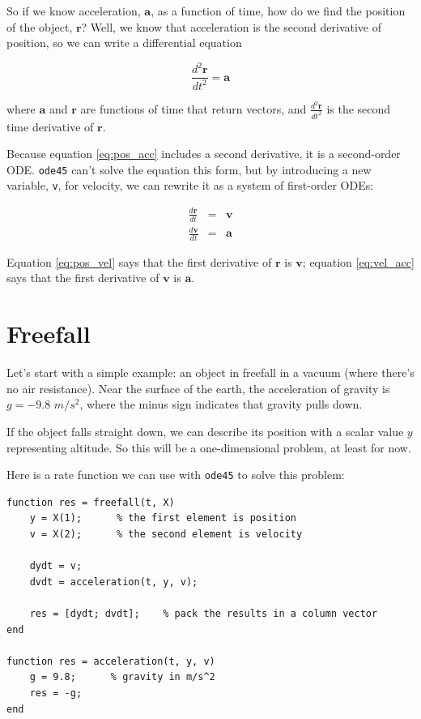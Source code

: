 \documentclass[
]{book}
\renewcommand{\vec}[1]{\bm{\mathbf{#1}}}
\begin{document}
So if we know acceleration, $\vec{a}$, as a function of time, how do we
find the position of the object, $\vec{r}$?  Well, we know that acceleration
is the second derivative of position, so we can write a differential
equation

\begin{equation}\label{eq:pos_acc}
    \frac{d^2\vec{r}}{dt^2} = \vec{a}
\end{equation}

where $\vec{a}$ and $\vec{r}$ are functions of time that return vectors,
and $\frac{d^2\vec{r}}{dt^2}$ is the second time derivative of $\vec{r}$.

Because equation \eqref{eq:pos_acc} includes a second derivative, it is
a second-order ODE.  {\tt ode45} can't solve the equation this form, but
by introducing a new variable, {\tt v}, for velocity, we can rewrite it
as a system of first-order ODEs:

\begin{eqnarray}
    \label{eq:pos_vel}
    \frac{d\vec{r}}{dt} &=& \vec{v} \\
    \label{eq:vel_acc}
    \frac{d\vec{v}}{dt} &=& \vec{a}
\end{eqnarray}

Equation \eqref{eq:pos_vel} says that the first derivative of $\vec{r}$ is $\vec{v}$;
equation \eqref{eq:vel_acc} says that the first derivative of $\vec{v}$ is $\vec{a}$.


\section{Freefall}
\label{sect:freefall}

Let's start with a simple example: an object in freefall in a vacuum
(where there's no air resistance).  Near the surface of the earth, the
acceleration of gravity is $g = -9.8$ $m/s^2$, where the minus sign
indicates that gravity pulls down.

If the object falls straight down, we can describe its position with a
scalar value $y$ representing altitude.  So this will be a
one-dimensional problem, at least for now.

Here is a rate function we can use with {\tt ode45} to solve
this problem:

\begin{verbatim}
function res = freefall(t, X)
    y = X(1);      % the first element is position
    v = X(2);      % the second element is velocity

    dydt = v;
    dvdt = acceleration(t, y, v);

    res = [dydt; dvdt];    % pack the results in a column vector
end

function res = acceleration(t, y, v)
    g = 9.8;      % gravity in m/s^2
    res = -g;
end
\end{verbatim}
\end{document}
